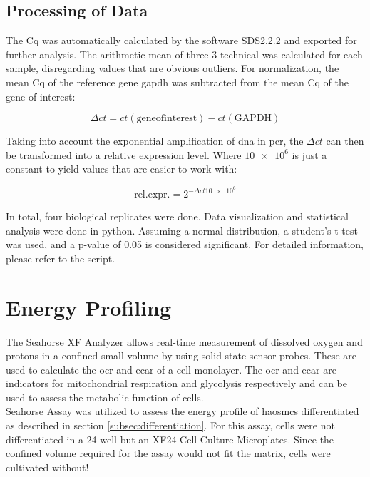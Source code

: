     \subsection{Processing of Data}
    The \ac{Cq} was automatically calculated by the software SDS2.2.2 and exported for further analysis. The arithmetic mean of three 3 technical was calculated for each sample, disregarding values that are obvious outliers. For normalization, the mean \ac{Cq} of the reference gene \ac{gapdh} was subtracted from the mean \ac{Cq} of the gene of interest:

    $$\Delta ct = ct(\mathrm{gene of interest}) - ct(\mathrm{GAPDH})$$

    Taking into account the exponential amplification of \ac{dna} in \ac{pcr}, the $\Delta ct$ can then be transformed into a relative expression level. Where $\num{10e6}$ is just a constant to yield values that are easier to work with:

    $$\mathrm{rel. expr.} = 2^{-\Delta ct\num{10e6}}$$

    In total, four biological replicates were done. Data visualization and statistical analysis were done in python. Assuming a normal distribution, a student's t-test was used, and a p-value of 0.05 is considered significant. For detailed information, please refer to the script.

\section{Energy Profiling}
\label{sec:seahorse}
The Seahorse XF Analyzer allows real-time measurement of dissolved oxygen and protons in a confined small volume by using solid-state sensor probes. These are used to calculate the \ac{ocr} and \ac{ecar} of a cell monolayer. The \ac{ocr} and \ac{ecar} are indicators for mitochondrial respiration and glycolysis respectively and can be used to assess the metabolic function of cells. \cite{agilenttechnologiesHowAgilentSeahorse}\\
Seahorse Assay was utilized to assess the energy profile of \acp{haosmc} differentiated as described in section \ref{subsec:differentiation}. For this assay, cells were not differentiated in a \ac{24 well} but an XF24 Cell Culture Microplates. Since the confined volume required for the assay would not fit the matrix, cells were cultivated without!

